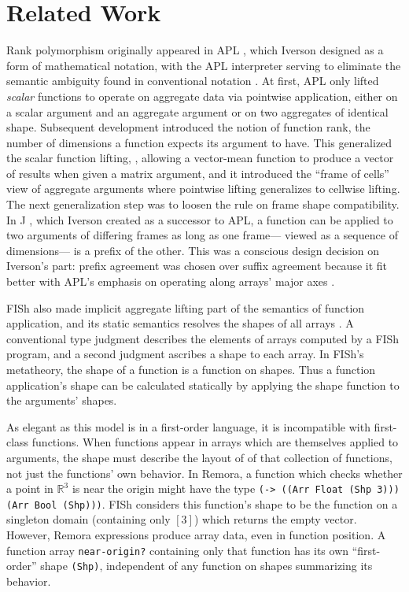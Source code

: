 \section{Related Work}
\label{sec:RelatedWork}

Rank polymorphism originally appeared in APL \cite{APL},
which Iverson designed as a form of mathematical notation,
with the APL interpreter serving to eliminate the semantic ambiguity
found in conventional notation \cite{IversonTuringLecture}.
At first, APL only lifted \emph{scalar} functions
to operate on aggregate data via pointwise application,
either on a scalar argument and an aggregate argument
or on two aggregates of identical shape.
Subsequent development introduced the notion of function rank,
the number of dimensions a function expects its argument to have.
This generalized the scalar function lifting,
\eg, allowing a vector-mean function to produce a vector of results
when given a matrix argument,
and it introduced the ``frame of cells'' view of aggregate arguments
where pointwise lifting generalizes to cellwise lifting.
The next generalization step was to loosen the rule
on frame shape compatibility.
In J \cite{J}, which Iverson created as a successor to APL,
a function can be applied to two arguments of differing frames
as long as one frame---%
viewed as a sequence of dimensions---%
is a prefix of the other.
This was a conscious design decision on Iverson's part:
prefix agreement was chosen over suffix agreement because
it fit better with APL's emphasis on operating along arrays' major axes \cite{RankAndUniformity}.

FISh also made implicit aggregate lifting part of the semantics of function application,
and its static semantics resolves the shapes of all arrays \cite{FISh}.
A conventional type judgment describes
the elements of arrays computed by a FISh program,
and a second judgment ascribes a shape to each array.
In FISh's metatheory,
the shape of a function is a function on shapes.
Thus a function application's shape can be calculated statically
by applying the shape function to the arguments' shapes.

As elegant as this model is in a first-order language,
it is incompatible with first-class functions.
When functions appear in arrays which are themselves applied to arguments,
the shape must describe
the layout of of that collection of functions,
not just the functions' own behavior.
In Remora, a function which checks
whether a point in $\mathbb{R}^3$ is near the origin
might have the type
{\tt (-> ((Arr Float (Shp 3))) (Arr Bool (Shp)))}.
FISh considers this function's shape to be
the function on a singleton domain
(containing only $[3]$)
which returns the empty vector.
However, Remora expressions produce array data,
even in function position.
A function array {\tt near-origin?} containing only that function
has its own ``first-order'' shape {\tt (Shp)},
independent of any function on shapes summarizing its behavior.

